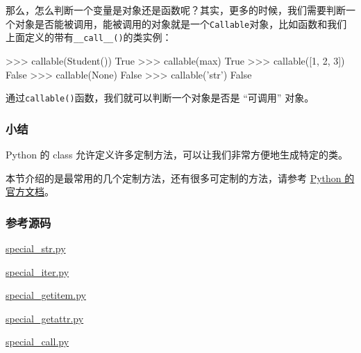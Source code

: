 那么，怎么判断一个变量是对象还是函数呢？其实，更多的时候，我们需要判断一个对象是否能被调用，能被调用的对象就是一个\texttt{Callable}对象，比如函数和我们上面定义的带有\texttt{\_\_call\_\_()}的类实例：

\begin{pythoncode}
>>> callable(Student())
True
>>> callable(max)
True
>>> callable([1, 2, 3])
False
>>> callable(None)
False
>>> callable('str')
False
\end{pythoncode}

通过\texttt{callable()}函数，我们就可以判断一个对象是否是 ``可调用''
对象。

\hypertarget{ux5c0fux7ed3}{%
\subsubsection{小结}\label{ux5c0fux7ed3}}

Python 的 class 允许定义许多定制方法，可以让我们非常方便地生成特定的类。

本节介绍的是最常用的几个定制方法，还有很多可定制的方法，请参考
\href{http://docs.python.org/3/reference/datamodel.html\#special-method-names}{Python
的官方文档}。

\hypertarget{ux53c2ux8003ux6e90ux7801}{%
\subsubsection{参考源码}\label{ux53c2ux8003ux6e90ux7801}}

\href{https://github.com/michaelliao/learn-python3/blob/master/samples/oop_advance/special_str.py}{special\_str.py}

\href{https://github.com/michaelliao/learn-python3/blob/master/samples/oop_advance/special_iter.py}{special\_iter.py}

\href{https://github.com/michaelliao/learn-python3/blob/master/samples/oop_advance/special_getitem.py}{special\_getitem.py}

\href{https://github.com/michaelliao/learn-python3/blob/master/samples/oop_advance/special_getattr.py}{special\_getattr.py}

\href{https://github.com/michaelliao/learn-python3/blob/master/samples/oop_advance/special_call.py}{special\_call.py}

